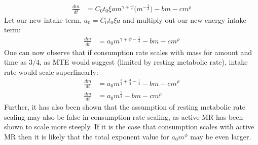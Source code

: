 \documentclass[a3paper]{article} %
\begin{document}
\begin{multicols}{2}
\begin{align}
    \frac{dm}{dt} &= C_{0}t_{0}\xi am^{\gamma + \psi}\Big(m^{-\frac{1}{4}}\Big) - bm - cm^{\rho}
\end{align}
Let our new intake term, $a_0 = C_{0}t_{0}\xi a$ and multiply out our new energy intake term:
\begin{align}
    \frac{dm}{dt} &= a_{0}m^{\gamma + \psi -\frac{1}{4}} - bm - cm^{\rho}
\end{align}
One can now observe that if consumption rate scales with mass for amount and time as $3/4$, as MTE would suggest (limited by resting metabolic rate), intake rate would scale superlinearly:
\begin{align}
    \frac{dm}{dt} &= a_{0}m^{\frac{3}{4} + \frac{3}{4} -\frac{1}{4}} - bm - cm^{\rho} \\
    \frac{dm}{dt} &= a_{0}m^{\frac{5}{4}} - bm - cm^{\rho}
\end{align}
Further, it has also been shown that the assumption of resting metabolic rate scaling may also be false in consumption rate scaling, as active MR has been shown to scale more steeply. If it is the case that consumption scales with active MR then it is likely that the total exponent value for $a_{0}m^\phi$ may be even larger.


\end{multicols}
\end{document}
